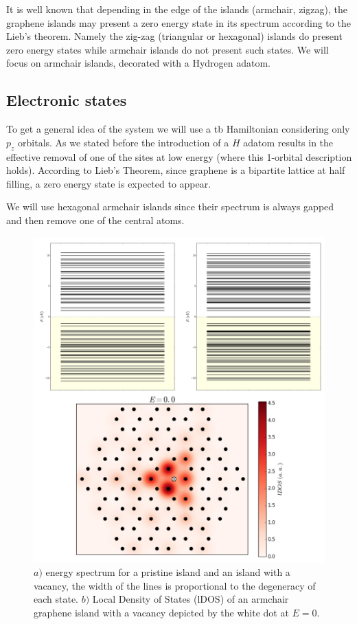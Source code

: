 It is well known that depending in the edge of the islands (armchair, zigzag), the graphene islands may present a zero energy state in its spectrum according to the Lieb's theorem. Namely the zig-zag (triangular or hexagonal) islands do present zero energy states while armchair islands do not present such states.
We will focus on armchair islands, decorated with a Hydrogen adatom.


\subsection{Electronic states}
To get a general idea of the system we will use a \ac{tb} Hamiltonian considering only $p_z$ orbitals. As we stated before the introduction of a $H$ adatom results in the effective removal of one of the sites at low energy (where this 1-orbital description holds). According to Lieb's Theorem, since graphene is a bipartite lattice at half filling, a zero energy state is expected to appear.

We will use hexagonal armchair islands since their spectrum is always gapped and then remove one of the central atoms.

\begin{figure}[h!]
\centering
\includegraphics{chapter05/figures/espectro.png}
\vspace{-5pt}
\caption{$a)$ energy spectrum for a pristine island and an island with a vacancy, the width of the lines is proportional to the degeneracy of each state. $b)$ Local Density of States (lDOS) of an armchair graphene island with a vacancy depicted by the white dot at $E=0$.}
\label{spectrum1}
\end{figure}
\FloatBarrier

